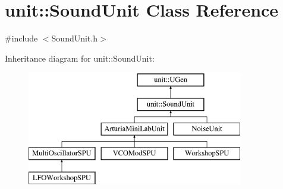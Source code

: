 \hypertarget{classunit_1_1SoundUnit}{\section{unit\-:\-:Sound\-Unit Class Reference}
\label{classunit_1_1SoundUnit}
}


{\ttfamily \#include $<$Sound\-Unit.\-h$>$}

Inheritance diagram for unit\-:\-:Sound\-Unit\-:\begin{figure}[H]
\begin{center}
\leavevmode
\includegraphics[height=5.000000cm]{classunit_1_1SoundUnit}
\end{center}
\end{figure}
